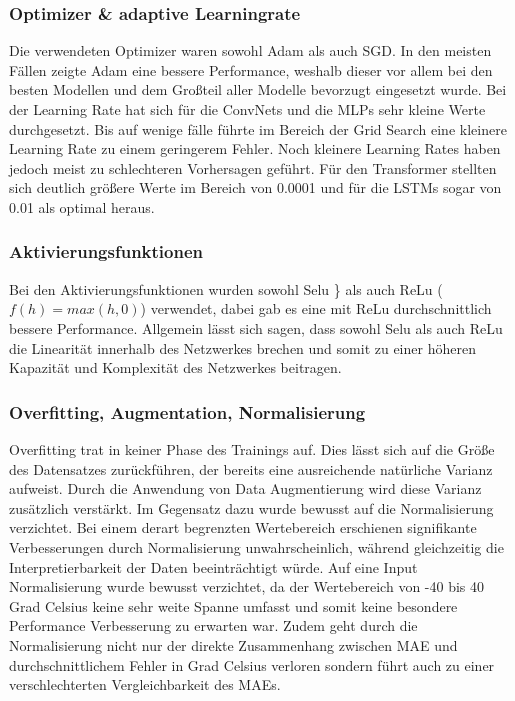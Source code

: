 \documentclass[acmtog, authorversion]{acmart} %
\begin{document}
\subsubsection{Optimizer \& adaptive Learningrate}
Die verwendeten Optimizer waren sowohl Adam als auch SGD. In den meisten Fällen zeigte Adam eine bessere Performance, weshalb dieser vor allem bei den besten Modellen und dem Großteil aller Modelle bevorzugt eingesetzt wurde.
Bei der Learning Rate hat sich für die ConvNets und die MLPs sehr kleine Werte durchgesetzt. Bis auf wenige fälle führte im Bereich der Grid Search eine kleinere Learning Rate zu einem geringerem Fehler. Noch kleinere Learning Rates haben jedoch meist zu schlechteren Vorhersagen geführt. Für den Transformer stellten sich deutlich größere Werte im Bereich von 0.0001 und für die LSTMs sogar von 0.01 als optimal heraus. 

\subsubsection{Aktivierungsfunktionen}
Bei den Aktivierungsfunktionen wurden sowohl Selu \} als auch ReLu ($f(h)=max(h,0)$) verwendet, dabei gab es eine mit ReLu durchschnittlich bessere Performance. Allgemein lässt sich sagen, dass sowohl Selu als auch ReLu die Linearität innerhalb des Netzwerkes brechen und somit zu einer höheren Kapazität und Komplexität des Netzwerkes beitragen.


\subsubsection{Overfitting, Augmentation, Normalisierung} 
Overfitting trat in keiner Phase des Trainings auf. Dies lässt sich auf die Größe des Datensatzes zurückführen, der bereits eine ausreichende natürliche Varianz aufweist. Durch die Anwendung von Data Augmentierung wird diese Varianz zusätzlich verstärkt.
Im Gegensatz dazu wurde bewusst auf die Normalisierung verzichtet. Bei einem derart begrenzten Wertebereich erschienen signifikante Verbesserungen durch Normalisierung unwahrscheinlich, während gleichzeitig die Interpretierbarkeit der Daten beeinträchtigt würde. 
Auf eine Input Normalisierung wurde bewusst verzichtet, da der Wertebereich von -40 bis 40 Grad Celsius keine sehr weite Spanne umfasst und somit keine besondere Performance Verbesserung zu erwarten war. Zudem geht durch die Normalisierung nicht nur der direkte Zusammenhang zwischen MAE und durchschnittlichem Fehler in Grad Celsius verloren sondern führt auch zu einer verschlechterten Vergleichbarkeit des MAEs.
\end{document}
